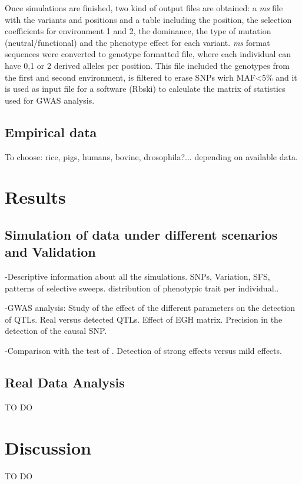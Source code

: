 \documentclass[a4paper,11pt]{article}
\begin{document}
\noindent Once simulations are finished, two kind of  output files are obtained: a \textit{ms} file with the variants and positions and a table including the position, the selection coefficients for environment 1 and 2, the dominance, the type of mutation (neutral/functional) and the phenotype effect for each variant.  \textit{ms} format sequences were converted to genotype formatted file, where each individual can have 0,1 or 2 derived alleles per position. This file included the genotypes from the first and second environment, is filtered to erase SNPs wirh MAF<5\% and it is used as input file for a software (Rbski) to calculate the matrix of statistics used for GWAS analysis.

\subsection{Empirical data}
To choose: rice, pigs, humans, bovine, drosophila?... depending on available data.

\section{Results}
\subsection{Simulation of data under different scenarios and Validation}
\noindent -Descriptive information about all the simulations. SNPs, Variation, SFS, patterns of selective sweeps. distribution of phenotypic trait per individual..\par
\noindent -GWAS analysis: Study of the effect of the different parameters on the detection of QTLs. Real versus detected QTLs. Effect of EGH matrix. Precision in the detection of the causal SNP.\par
\noindent -Comparison with the test of \citet{Beissinger:2018aa}. Detection of strong effects versus mild effects. \par

\subsection{Real Data Analysis}
TO DO

\section{Discussion}
TO DO
\end{document}
